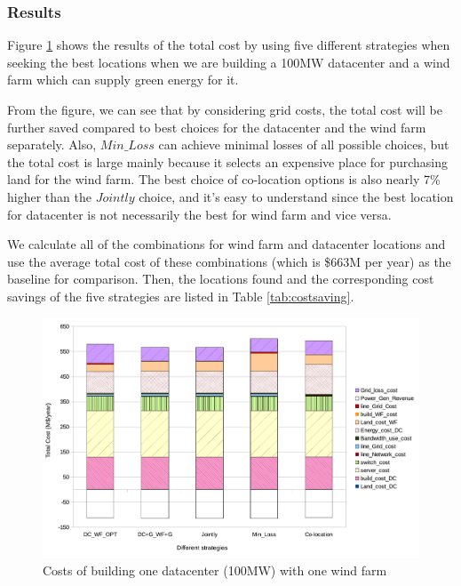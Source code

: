 \subsubsection{Results}
Figure \ref{fig:cost1dc1wf} shows the results of the total cost by using five different strategies when seeking the best locations when we are building a 100MW datacenter and a wind farm which can supply green energy for it.

From the figure, we can see that by considering grid costs, the total cost will be further saved compared to best choices for the datacenter and the wind farm separately. Also, $Min\_Loss$ can achieve minimal losses of all possible choices, but the total cost is large mainly because it selects an expensive place for purchasing land for the wind farm. The best choice of co-location options is also nearly 7\% higher than the $Jointly$ choice, and it's easy to understand since the best location for datacenter is not necessarily the best for wind farm and vice versa.

We calculate all of the combinations for wind farm and datacenter locations and use the average total cost of these combinations (which is \$663M per year) as the baseline for comparison. Then, the locations found and the corresponding cost savings of the five strategies are listed in Table \ref{tab:costsaving}.

\begin{figure}[ht]
\centering
\includegraphics[width=1\columnwidth]{img/cost-one-dc-one-wf}
\caption{Costs of building one datacenter (100MW) with one wind farm}
\label{fig:cost1dc1wf}
\end{figure}

